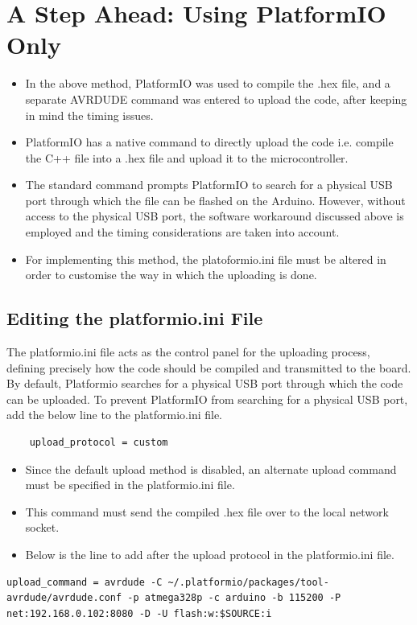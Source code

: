 \documentclass[conference]{IEEEtran} %
\begin{document}
\section{A Step Ahead: Using PlatformIO Only}

\begin{itemize}
    \item In the above method, PlatformIO was used to compile the .hex file, and a separate AVRDUDE command was entered to upload the code, after keeping in mind the timing issues. 
    \item PlatformIO has a native command to directly upload the code i.e. compile the C++ file into a .hex file and upload it to the microcontroller. 
    \item The standard command prompts PlatformIO to search for a physical USB port through which the file can be flashed on the Arduino. However, without access to the physical USB port, the software workaround discussed above is employed and the timing considerations are taken into account. 
    \item For implementing this method, the platoformio.ini file must be altered in order to customise the way in which the uploading is done. 
\end{itemize}

\subsection{Editing the platformio.ini File}

The platformio.ini file acts as the control panel for the uploading process, defining precisely how the code should be compiled and transmitted to the board. \\
By default, Platformio searches for a physical USB port through which the code can be uploaded. To prevent PlatformIO from searching for a physical USB port, add the below line to the platformio.ini file. 

\begin{lstlisting}
    upload_protocol = custom
\end{lstlisting}

\begin{itemize}
    \item Since the default upload method is disabled, an alternate upload command must be specified in the platformio.ini file. 
    \item This command must send the compiled .hex file over to the local network socket. 
    \item Below is the line to add after the upload protocol in the platformio.ini file. 
\end{itemize}
\begin{lstlisting}
upload_command = avrdude -C ~/.platformio/packages/tool-avrdude/avrdude.conf -p atmega328p -c arduino -b 115200 -P net:192.168.0.102:8080 -D -U flash:w:$SOURCE:i
\end{lstlisting}
\end{document}
